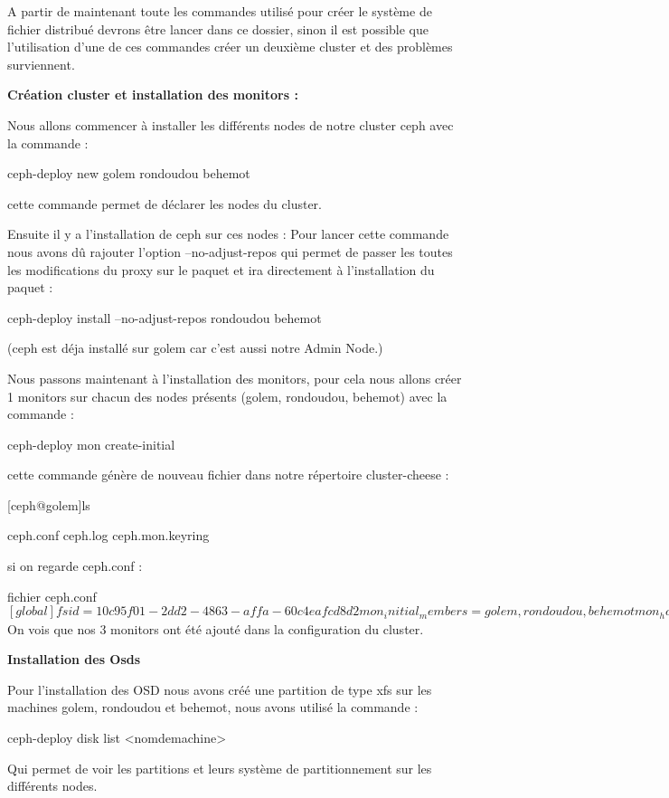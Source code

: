 \documentclass{article}
\begin{document}
A partir de maintenant toute les commandes utilisé pour créer le système de fichier distribué devrons être lancer dans ce dossier, sinon il est possible que l'utilisation d'une de ces commandes créer un deuxième cluster et des problèmes surviennent.

\textbf{Création cluster et installation des monitors :}

Nous allons commencer à installer les différents nodes de notre cluster ceph avec la commande :

ceph-deploy new golem rondoudou behemot

cette commande permet de déclarer les nodes du cluster.

Ensuite il y a l'installation de ceph sur ces nodes :
Pour lancer cette commande nous avons dû rajouter l'option --no-adjust-repos qui permet de passer les toutes les modifications du proxy sur le paquet et ira directement à l'installation du paquet :

ceph-deploy install --no-adjust-repos rondoudou behemot 

(ceph est déja installé sur golem car c'est aussi notre Admin Node.)

Nous passons maintenant à l'installation des monitors, pour cela nous allons créer 1 monitors sur chacun des nodes présents (golem, rondoudou, behemot) avec la commande :

ceph-deploy mon create-initial

cette commande génère de nouveau fichier dans notre répertoire cluster-cheese :

[ceph@golem]ls

ceph.conf ceph.log ceph.mon.keyring

si on regarde ceph.conf :

fichier ceph.conf
$
[global]
fsid = 10c95f01-2dd2-4863-affa-60c4eafcd8d2
mon_ initial_members = golem, rondoudou, behemot
mon_host = 192.168.1.51, 192.168.1.29, 192.168.1.56
auth cluster required = cephx
auth service required = cephx
auth client required = cephx
osd_journal_size = 1024
$
\\On vois que nos 3 monitors ont été ajouté dans la configuration du cluster.

\textbf{Installation des Osds}

Pour l'installation des OSD nous avons créé une partition de type xfs sur les
machines golem, rondoudou et behemot, nous avons utilisé la commande :

ceph-deploy disk list <nomdemachine>

Qui permet de voir les partitions et leurs système de partitionnement sur les différents nodes.
\end{document}
